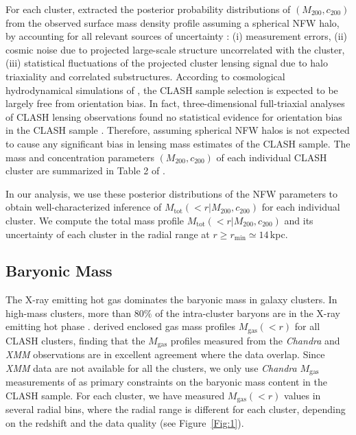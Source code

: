 \documentclass[a4paper,iop,twocolumn,twocolappendix,numberedappendix,appendixfloats]{emulateapj}
\newcommand{\percent}{\ensuremath{\%}}
\newcommand{\Mtot}{M_\mathrm{tot}}
\newcommand{\Mgas}{M_\mathrm{gas}}
\begin{document}
For each cluster, \citet{Umetsu16} extracted the posterior probability
distributions of $(M_{200},c_{200})$ from the observed surface
mass density profile assuming a spherical NFW halo, by accounting for
all relevant sources of uncertainty
\citep[e.g.,][]{Umetsu16,Umetsu20,Miyatake19}:
(i) measurement errors,
(ii) cosmic noise due to projected large-scale structure uncorrelated
with the cluster,
(iii) statistical fluctuations of the projected cluster lensing signal
due to halo triaxiality and correlated substructures.
According to cosmological hydrodynamical
simulations of \citet{Meneghetti14}, the CLASH sample selection is
expected to be largely free from orientation bias.
In fact, three-dimensional full-triaxial analyses of CLASH lensing
observations found no statistical evidence for orientation bias in the
CLASH sample \citep[see][]{Sereno18,Chiu18}.
Therefore, assuming spherical NFW halos is not expected to cause any
significant bias in lensing mass estimates of the CLASH sample.
The mass and concentration parameters $(M_{200}, c_{200})$ of each
individual CLASH cluster are summarized in Table 2 of
\citet[][]{Umetsu16}.


In our analysis, we use these posterior distributions of the NFW
parameters to obtain well-characterized inference
of $\Mtot(<r|M_{200},c_{200})$ for each individual cluster.
We compute the total mass profile $\Mtot(<r|M_{200},c_{200})$ and its
uncertainty of each cluster in the radial range at $r\ge
r_\mathrm{min}\simeq 14$\,kpc.



\subsection{Baryonic Mass}
\label{subsec:stars}

The X-ray emitting hot gas dominates the baryonic mass in galaxy
clusters. In high-mass clusters, more than $80\percent$ of the
intra-cluster baryons are in the X-ray emitting hot phase
\citep[e.g.,][]{Umetsu09, Donahue14, Okabe14, Chiu18}.
\citet{Donahue14} derived enclosed gas mass profiles $\Mgas(<r)$ for all
CLASH clusters, finding that the $\Mgas$ profiles measured from the {\em
Chandra} and {\em XMM} observations are in excellent agreement
where the data overlap.
Since {\em XMM} data are not available for all the clusters,
we only use {\em Chandra} $\Mgas$ measurements of
\citet{Donahue14} as primary constraints on the baryonic mass content in
the CLASH sample.  For each cluster, we have measured $\Mgas(<r)$ values
in several radial bins, where the radial range is different for each
cluster, depending on the redshift and the data quality (see Figure~\ref{Fig:1}).
\end{document}
